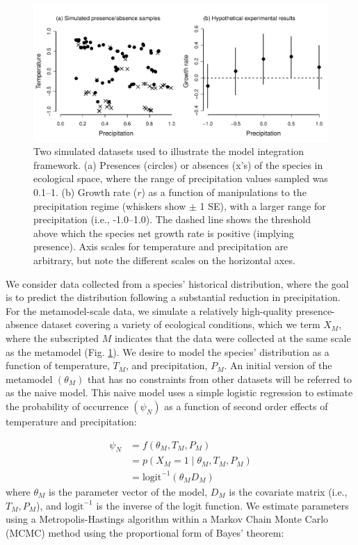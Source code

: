 \documentclass[11pt]{article}
\begin{document}
\begin{figure}[t]
	\includegraphics{figs/ex1_sampling.pdf}
	\caption{Two simulated datasets used to illustrate the model integration framework.
	(a) Presences (circles) or absences (x's) of the species in ecological space, where the range of precipitation values sampled was 0.1--1.
	(b) Growth rate ($r$) as a function of manipulations to the precipitation regime (whiskers show $\pm$ 1 SE), with a larger range for precipitation (i.e., -1.0--1.0).
	The dashed line shows the threshold above which the species net growth rate is positive (implying presence).
	Axis scales for temperature and precipitation are arbitrary, but note the different scales on the horizontal axes.}
	\label{fig:ex1_sampling}
\end{figure}

We consider data collected from a species' historical distribution, where the goal is to predict the distribution following a substantial reduction in precipitation.
For the metamodel-scale data, we simulate a relatively high-quality presence-absence dataset covering a variety of ecological conditions, which we term \(X_M\), where the subscripted \(M\) indicates that the data were collected at the same scale as the metamodel (Fig. \ref{fig:ex1_sampling}).
We desire to model the species' distribution as a function of temperature, \(T_M\), and precipitation, \(P_M\).
An initial version of the metamodel \((\theta_M)\) that has no constraints from other datasets will be referred to as the naive model.
This naive model uses a simple logistic regression to estimate the probability of occurrence \((\psi_N)\) as a function of second order effects of temperature and precipitation:

\begin{equation}
\begin{aligned}
	\psi_N &= f\left(\theta_M, T_M, P_M \right) \\
	&= p \left (X_M = 1 \mid \theta_M, T_M, P_M \right) \\
	&=\text{logit}^{-1}\left( \theta_M D_M \right)
\end{aligned}
\end{equation}
where \(\theta_M\) is the parameter vector of the model, \(D_M\) is the covariate matrix (i.e., \(T_M, P_M\)), and \(\text{logit}^{-1}\) is the inverse of the logit function.
We estimate parameters using a Metropolis-Hastings algorithm within a Markov Chain Monte Carlo (MCMC) method using the proportional form of Bayes' theorem:
\end{document}
